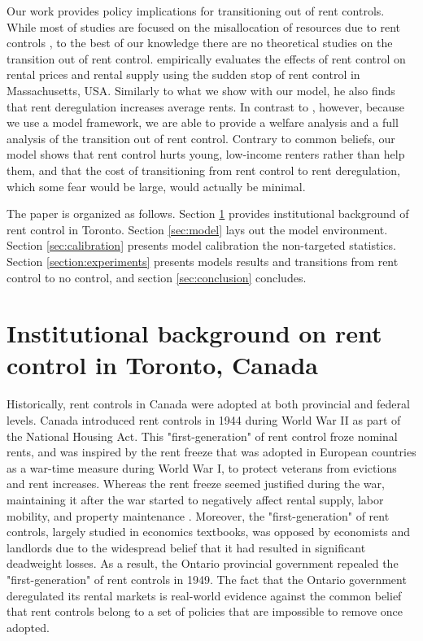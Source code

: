 \documentclass[parskip=full]{article}
\begin{document}
Our work provides policy implications for transitioning out of rent controls. While most of studies are focused on the misallocation of resources due to rent controls \citep{gl-2003}, to the best of our knowledge there are no theoretical studies on the transition out of rent control. \citet{sims-2007} empirically evaluates the effects of rent control on rental prices and rental supply using the sudden stop of rent control in Massachusetts, USA. Similarly to what we show with our model, he also finds that rent deregulation increases average rents. In contrast to \citet{sims-2007}, however, because we use a model framework, we are able to provide a welfare analysis and a full analysis of the transition out of rent control. Contrary to common beliefs, our model shows that rent control hurts young, low-income renters rather than help them, and that the cost of transitioning from rent control to rent deregulation, which some fear would be large, would actually be minimal. 

The paper is organized as follows. Section \ref{sec:insitutional_background} provides institutional background of rent control in Toronto. Section \ref{sec:model} lays out the model environment. Section \ref{sec:calibration} presents model calibration the non-targeted statistics. Section \ref{section:experiments} presents models results and transitions from rent control to no control, and section \ref{sec:conclusion} concludes. 

\section{Institutional background on rent control in Toronto, Canada}\label{sec:insitutional_background}
Historically, rent controls in Canada were adopted at both provincial and federal levels. Canada introduced rent controls in 1944 during World War II as part of the National Housing Act. This "first-generation" of rent control froze nominal rents, and was inspired by the rent freeze that was adopted in European countries as a war-time measure during World War I, to protect veterans from evictions and rent increases. Whereas the rent freeze seemed justified during the war, maintaining it after the war started to negatively affect rental supply, labor mobility, and property maintenance \citep{arnott-1995}. Moreover, the "first-generation" of rent controls, largely studied in economics textbooks, was opposed by economists and landlords due to the widespread belief that it had resulted in significant deadweight losses. As a result, the Ontario provincial government repealed the "first-generation" of rent controls in 1949. The fact that the Ontario government deregulated its rental markets is real-world evidence against the common belief that rent controls belong to a set of policies that are impossible to remove once adopted. 
\end{document}
